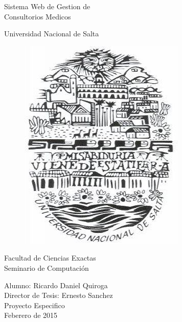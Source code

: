 
%


\begin{titlepage}


\begin{center}
    {\fontsize{45}{45} \selectfont
    Sistema Web de Gestion de \\ Consultorios Medicos \\[2.3cm] }
\end{center}


\begin{center}
    \LARGE Universidad Nacional de Salta \\
    \begin{figure}[h]
        \begin{center}
        \includegraphics[scale=0.5]{resourse/logo-UNSa.jpg}
        \end{center}
    \end{figure}


    \LARGE Facultad de Ciencias Exactas \\
    Seminario de Computaci\'on \\ [2.3cm]
\end{center}


\begin{flushright}
    \Large Alumno: Ricardo Daniel Quiroga \\
    Director de Tesis: Ernesto Sanchez \\
    Proyecto Especifico \\
    {Feberero} de 2015


\end{flushright}



\end{titlepage}


